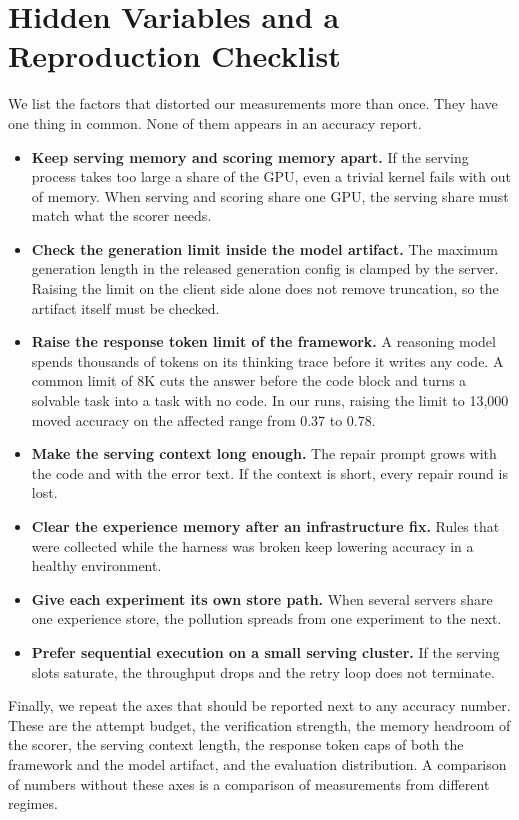 \section{Hidden Variables and a Reproduction Checklist}

We list the factors that distorted our measurements more than once. They have one thing in common.
None of them appears in an accuracy report.

\begin{itemize}\itemsep3pt
\item \textbf{Keep serving memory and scoring memory apart.}
If the serving process takes too large a share of the GPU, even a trivial kernel fails with out of
memory. When serving and scoring share one GPU, the serving share must match what the scorer needs.
\item \textbf{Check the generation limit inside the model artifact.}
The maximum generation length in the released generation config is clamped by the server. Raising
the limit on the client side alone does not remove truncation, so the artifact itself must be
checked.
\item \textbf{Raise the response token limit of the framework.}
A reasoning model spends thousands of tokens on its thinking trace before it writes any code. A
common limit of 8K cuts the answer before the code block and turns a solvable task into a task with
no code. In our runs, raising the limit to 13{,}000 moved accuracy on the affected range from 0.37
to 0.78.
\item \textbf{Make the serving context long enough.}
The repair prompt grows with the code and with the error text. If the context is short, every repair
round is lost.
\item \textbf{Clear the experience memory after an infrastructure fix.}
Rules that were collected while the harness was broken keep lowering accuracy in a healthy
environment.
\item \textbf{Give each experiment its own store path.}
When several servers share one experience store, the pollution spreads from one experiment to the
next.
\item \textbf{Prefer sequential execution on a small serving cluster.}
If the serving slots saturate, the throughput drops and the retry loop does not terminate.
\end{itemize}

Finally, we repeat the axes that should be reported next to any accuracy number. These are the
attempt budget, the verification strength, the memory headroom of the scorer, the serving context
length, the response token caps of both the framework and the model artifact, and the evaluation
distribution. A comparison of numbers without these axes is a comparison of measurements from
different regimes.

